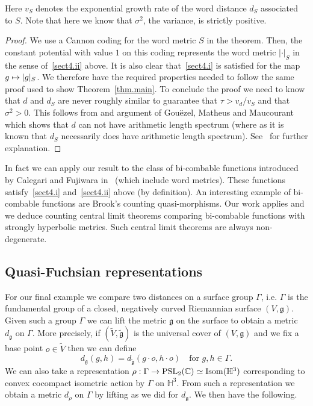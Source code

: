 \documentclass[AHL,Unicode,longabstracts,published]{cedram}
\newcommand{\G}{\Gamma}
\newcommand{\fkg}{\mathfrak{g}}
\newcommand{\C}{\mathbb{C}}
\renewcommand{\H}{\mathbb{H}}
\DeclareMathOperator{\PSL}{PSL}
\renewcommand*{\to}{\mathchoice{\longrightarrow}{\rightarrow}{\rightarrow}{\rightarrow}}
\let\oldmapsto\mapsto
\renewcommand*{\mapsto}{\mathchoice{\longmapsto}{\oldmapsto}{\oldmapsto}{\oldmapsto}}
\theoremstyle{plain}
\newcommand{\G}{\Gamma}
\begin{document}
Here $v_S$ denotes the exponential growth rate of the word distance $d_S$ associated to $S$. Note that here we know that $\sigma^2$, the variance, is strictly positive.
\begin{proof}
We use a Cannon coding for the word metric $S$ in the theorem. Then, the constant potential with value $1$ on this coding represents the word metric $|\cdot|_S$ in the sense of~\eqref{sect4.ii} above. It is also clear that~\eqref{sect4.i} is satisfied for the map $g \mapsto |g|_S$. We therefore have the required properties needed to follow the same proof used to show Theorem~\ref{thm.main}. To conclude the proof we need to know that $d$ and $d_S$ are never roughly similar to guarantee that $\tau > v_d/v_S$ and that $\sigma^2 > 0$. This follows from and argument of Gou\"ezel, Matheus and Maucourant~\cite{GMM2018} which shows that $d$ can not have arithmetic length spectrum (where as it is known that $d_S$ necessarily does have arithmetic length spectrum). See~\cite[Proposition~1.13]{cantrell} for further explanation.
\end{proof}

In fact we can apply our result to the class of bi-combable functions introduced by Calegari and Fujiwara in~\cite{CalegariFujiwara2010} (which include word metrics). These functions satisfy~\eqref{sect4.i} and~\eqref{sect4.ii} above (by definition). An interesting example of bi-combable functions are Brook's counting quasi-morphisms. Our work applies and we deduce counting central limit theorems comparing bi-combable functions with strongly hyperbolic metrics. Such central limit theorems are always non-degenerate.



\subsection{Quasi-Fuchsian representations} For our final example we compare two distances on a surface group $\G$, i.e. $\G$ is the fundamental group of a closed, negatively curved Riemannian surface $(V,\fkg)$. Given such a group $\G$ we can lift the metric $\fkg$ on the surface to obtain a metric $d_\fkg$ on $\G$. More precisely, if $(\widetilde{V}, \widetilde{\fkg})$ is the universal cover of $(V,\fkg)$ and we fix a base point $o\in\widetilde{V}$ then we can define
\[
d_\fkg(g,h) = d_{\widetilde{\fkg}}(g \cdot o, h \cdot o) \quad \text{for }g,h \in \G.
\]
We can also take a representation $\rho : \G \to \PSL_2(\C) \simeq \text{Isom}(\H^3)$ corresponding to convex cocompact isometric action by $\G$ on $\H^3$. From such a representation we obtain a metric $d_{\rho}$ on $\G$ by lifting as we did for $d_\fkg$. We then have the following.
\end{document}
